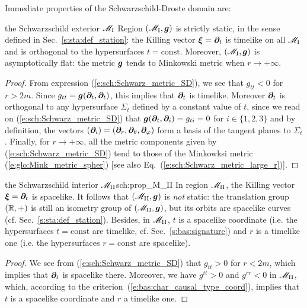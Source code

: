 Immediate properties of the Schwarzschild-Droste domain are:

\begin{tprop}{the Schwarzschild exterior $\mathscr{M}_{\rm I}$}{}
Region $(\mathscr{M}_{\rm I}, \bm{g})$ is strictly static, in the sense defined in
Sec.~\ref{s:sta:def_station}: the Killing vector $\bm{\xi} = \bm{\partial}_t$ is
timelike on all $\mathscr{M}_{\rm I}$ and is orthogonal to the hypersurfaces $t= \mathrm{const}$.
Moreover, $(\mathscr{M}_{\rm I}, \bm{g})$ is asymptotically flat: the metric $\bm{g}$ tends to Minkowski metric
when $r\rightarrow +\infty$.
\end{tprop}

\begin{proof}
From expression (\ref{e:sch:Schwarz_metric_SD}), we see that $g_{tt} < 0$ for $r > 2 m$.
Since $g_{tt} = \bm{g}(\bm{\partial}_t, \bm{\partial}_t)$, this implies that $\bm{\partial}_t$ is timelike.
Moreover $\bm{\partial}_t$ is orthogonal to any hypersurface $\Sigma_t$ defined by a constant
value of $t$, since we read on (\ref{e:sch:Schwarz_metric_SD}) that
$\bm{g}(\bm{\partial}_t, \bm{\partial}_i) = g_{ti} = 0$ for $i\in\{1,2,3\}$ and by definition,
the vectors $(\bm{\partial}_i) = (\bm{\partial}_r,\bm{\partial}_\theta,\bm{\partial}_\varphi)$ form a basis of the tangent planes to $\Sigma_t$.
Finally, for $r\to +\infty$, all the metric components given by (\ref{e:sch:Schwarz_metric_SD})
tend to those of the Minkowksi metric (\ref{e:glo:Mink_metric_spher})
[see also Eq.~(\ref{e:sch:Schwarz_metric_large_r})].
\end{proof}

\begin{tprop}{the Schwarzschild interior $\mathscr{M}_{\rm II}$}{sch:prop_M_II}
In region $\mathscr{M}_{\rm II}$, the Killing vector $\bm{\xi} = \bm{\partial}_t$ is spacelike.
It follows that $(\mathscr{M}_{\rm II},\bm{g})$ is \emph{not} static:
the translation group $(\mathbb{R},+)$ is still an
isometry group of $(\mathscr{M}_{\rm II},\bm{g})$, but its orbits are spacelike curves
(cf. Sec.~\ref{s:sta:def_station}).
Besides, in $\mathscr{M}_{\rm II}$, $t$ is a spacelike coordinate
(i.e. the hypersurfaces $t=\mathrm{const}$ are timelike, cf. Sec.~\ref{s:bas:signature})
and $r$ is a timelike one (i.e. the hypersurfaces $r=\mathrm{const}$ are spacelike).
\end{tprop}

\begin{proof}
We see from (\ref{e:sch:Schwarz_metric_SD}) that $g_{tt} > 0$ for $r< 2m$,
which implies that $\bm{\partial}_t$ is spacelike there.
Moreover, we have $g^{tt} > 0$ and $g^{rr} < 0$ in
$\mathscr{M}_{\rm II}$, which, according to the criterion~(\ref{e:bas:char_causal_type_coord}),
implies that $t$ is a spacelike coordinate
and $r$ a timelike one.
\end{proof}

